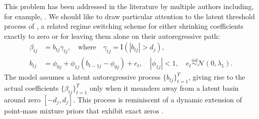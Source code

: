 \documentclass[ba]{imsart}
\numberwithin{equation}{section}
\theoremstyle{plain}
\def\B{\mbox{\boldmath$B$}}
\def\bG{\bm{\Gamma}}
\def\b{\mbox{\boldmath$b$}}
\def\B{\mbox{\boldmath$B$}}
\newcommand{\bm}[1]{\boldsymbol{#1}}
\newcommand{\iid}{\stackrel{iid}{\sim}}
\def\B{\bm{B}}
\def\bg{\bm{\gamma}}
\def\b{\bm{\beta}}
\begin{document}
This problem has been addressed in the literature by multiple authors including, for example,  \cite{groen,belmonte, koop, kalli_griffin, nakajima_west}. 
 We should like to draw particular attention to the latent threshold process of  \cite{nakajima_west}, %
 a related regime switching scheme for either shrinking coefficients exactly to zero or for leaving them alone on their autoregressive path:
\begin{align}
\beta_{tj}&=b_{tj}\gamma_{tj},\quad\text{where}\quad \gamma_{tj}=\mathrm{I}(|b_{tj}|>d_j),\label{nw1}\\
b_{tj}&=\phi_{0j}+\phi_{1j}(b_{t-1j}-\phi_{0j})+e_t,\quad |\phi_{1j}|<1,\quad e_t\iid\mathcal{N}(0,\lambda_1).\label{nw2}
\end{align}
The model assumes a latent autoregressive process $\{b_{tj}\}_{t=1}^T$, giving rise to the actual coefficients $\{\beta_{tj}\}_{t=1}^T$ only when it meanders away from a latent basin around zero $[-d_j,d_j]$. 
This process is reminiscent of a dynamic extension of point-mass mixture priors that exhibit exact zeros \citep{mitchell_beauchamp}. 
\end{document}
